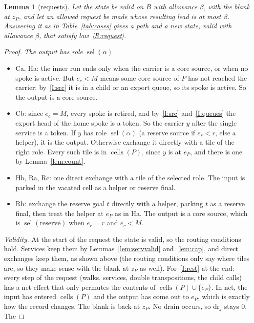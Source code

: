 \documentclass[11pt]{amsart}
\newtheorem{lemma}[theorem]{Lemma}
\theoremstyle{definition}
\newcommand{\cells}{\operatorname{cells}}
\newcommand{\sel}{\operatorname{sel}}
\begin{document}
\begin{lemma}[requests]\label{lem:requests}
Let the state be valid on $B$ with allowance $\beta$, with the blank at $z_P$, and let an allowed request be made whose resulting
lead is at most $\beta$. Answering it as in Table~\ref{tab:cases} gives a path and a new state, valid with allowance $\beta$, that satisfy
law~\ref{R:request}.
\end{lemma}

\begin{proof}
\emph{The output has role $\sel(\alpha)$.}
\begin{itemize}[nosep]
\item Ca, Ha: the inner run ends only when the carrier is a core source, or when no spoke is active. But $e_c<M$ means some core source
  of $P$ has not reached the carrier; by~\ref{I:src} it is in a child or an export queue, so its spoke is active. So the output is a core source.
\item Cb: since $e_c=M$, every spoke is retired, and by~\ref{I:src} and~\ref{I:queues} the export head of the home spoke is a token. So the
  carrier $y$ after the single service is a token. If $y$ has role $\sel(\alpha)$ (a reserve source if $e_r<r$, else a helper), it is the
  output. Otherwise exchange it directly with a tile of the right role. Every such tile is in $\cells(P)$, since $y$ is at $e_P$, and there
  is one by Lemma~\ref{lem:count}.
\item Hb, Ra, Rc: one direct exchange with a tile of the selected role. The input is parked in the vacated cell as a helper or reserve final.
\item Rb: exchange the reserve goal $t$ directly with a helper, parking $t$ as a reserve final, then treat the helper at $e_P$ as in Ha.
  The output is a core source, which is $\sel(\text{reserve})$ when $e_r=r$ and $e_c<M$.
\end{itemize}
\emph{Validity.} At the start of the request the state is valid, so the routing conditions hold. Services keep them by
Lemmas~\ref{lem:servvalid} and~\ref{lem:cap}, and direct exchanges keep them, as shown above (the routing conditions only say where tiles are, so they make sense with
the blank at $z_P$ as well). For~\ref{I:rest} at the end: every step
of the request (walks, services, double transpositions, the child calls) has a net effect that only permutes the contents of
$\cells(P)\cup\{e_P\}$. In net, the input has entered $\cells(P)$ and the output has come out to $e_P$, which is exactly how the record
changes. The blank is back at $z_P$. No drain occurs, so $\mathrm{dr}_j$ stays $0$. The

\end{proof}
\end{document}
